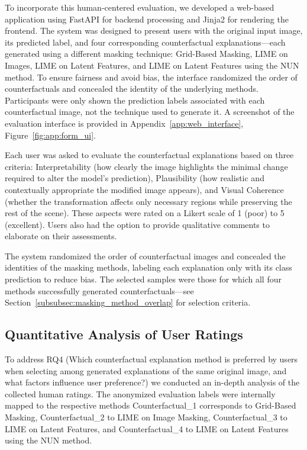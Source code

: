 To incorporate this human-centered evaluation, we developed a web-based application using FastAPI for backend processing and Jinja2 for rendering the frontend. The system was designed to present users with the original input image, its predicted label, and four corresponding counterfactual explanations—each generated using a different masking technique: Grid-Based Masking, LIME on Images, LIME on Latent Features, and LIME on Latent Features using the NUN method. To ensure fairness and avoid bias, the interface randomized the order of counterfactuals and concealed the identity of the underlying methods. Participants were only shown the prediction labels associated with each counterfactual image, not the technique used to generate it. A screenshot of the evaluation interface is provided in Appendix~\ref{app:web_interface}, Figure~\ref{fig:app:form_ui}.

Each user was asked to evaluate the counterfactual explanations based on three criteria: Interpretability (how clearly the image highlights the minimal change required to alter the model’s prediction), Plausibility (how realistic and contextually appropriate the modified image appears), and Visual Coherence (whether the transformation affects only necessary regions while preserving the rest of the scene). These aspects were rated on a Likert scale of 1 (poor) to 5 (excellent). Users also had the option to provide qualitative comments to elaborate on their assessments.

The system randomized the order of counterfactual images and concealed the identities of the masking methods, labeling each explanation only with its class prediction to reduce bias. The selected samples were those for which all four methods successfully generated counterfactuals—see Section~\ref{subsubsec:masking_method_overlap} for selection criteria.



\subsection{Quantitative Analysis of User Ratings} \label{subsubsec:quantitative_analysis_of_user_ratings}
To address RQ4 (Which counterfactual explanation method is preferred by users when selecting among generated explanations of the same original image, and what factors influence user preference?) we conducted an in-depth analysis of the collected human ratings. The anonymized evaluation labels were internally mapped to the respective methods Counterfactual\_1 corresponds to Grid-Based Masking, Counterfactual\_2 to LIME on Image Masking, Counterfactual\_3 to LIME on Latent Features, and Counterfactual\_4 to LIME on Latent Features using the NUN method.



